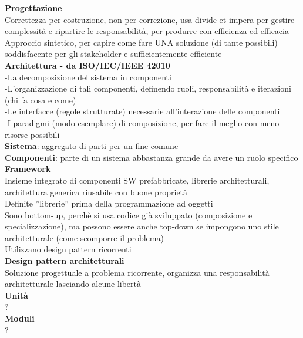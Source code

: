 \documentclass{article}
\begin{document}
		\textbf{Progettazione}\\
		Correttezza per costruzione, non per correzione, usa divide-et-impera per gestire complessità e ripartire le responsabilità, per produrre con efficienza ed efficacia\\
		Approccio sintetico, per capire come fare UNA soluzione (di tante possibili) soddisfacente per gli stakeholder e sufficientemente efficiente\\
		
		\textbf{Architettura - da ISO/IEC/IEEE 42010}\\
		-La decomposizione del sistema in componenti\\
		-L'organizzazione di tali componenti, definendo ruoli, responsabilità e iterazioni (chi fa cosa e come)\\
		-Le interfacce (regole strutturate) necessarie all'interazione delle componenti\\
		-I paradigmi (modo esemplare) di composizione, per fare il meglio con meno risorse possibili\\
		
		\textbf{Sistema}: aggregato di parti per un fine comune\\
		
		\textbf{Componenti}: parte di un sistema abbastanza grande da avere un ruolo specifico\\
		
		\textbf{Framework}\\
		Insieme integrato di componenti SW prefabbricate, librerie architetturali, architettura generica riusabile con buone proprietà\\
		Definite ''librerie'' prima della programmazione ad oggetti\\
		Sono bottom-up, perchè si usa codice già sviluppato (composizione e specializzazione), ma possono essere anche top-down se impongono uno stile architetturale (come scomporre il problema)\\
		Utilizzano design pattern ricorrenti\\
		
		\textbf{Design pattern architetturali}\\
		Soluzione progettuale a problema ricorrente, organizza una responsabilità architetturale lasciando alcune libertà\\
		
		\textbf{Unità}\\
		?\\
		
		\textbf{Moduli}\\
		?\\
		
\end{document}
